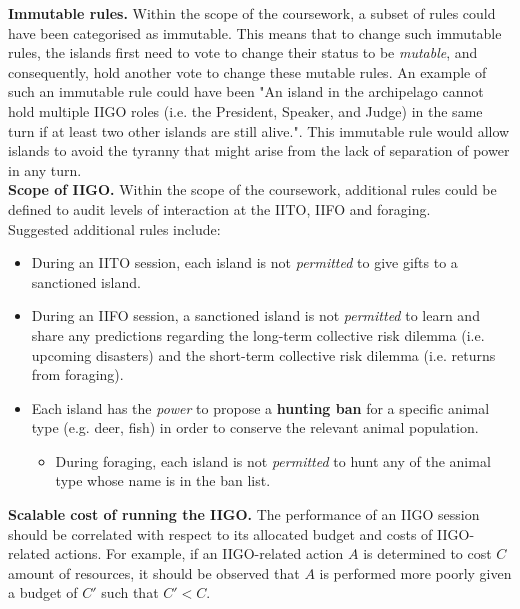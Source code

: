 \textbf{Immutable rules.} Within the scope of the coursework, a subset of rules could have been categorised as immutable. This means that to change such immutable rules, the islands first need to vote to change their status to be \emph{mutable}, and consequently, hold another vote to change these mutable rules. An example of such an immutable rule could have been "An island in the archipelago cannot hold multiple IIGO roles (i.e. the President, Speaker, and Judge) in the same turn if at least two other islands are still alive.". This immutable rule would allow islands to avoid the tyranny that might arise from the lack of separation of power in any turn.\\
\textbf{Scope of IIGO.} Within the scope of the coursework, additional rules could be defined to audit levels of interaction at the IITO, IIFO and foraging. \\
    Suggested additional rules include:
        \begin{itemize}
            \item During an IITO session, each island is not \emph{permitted} to give gifts to a sanctioned island.
             \item During an IIFO session, a sanctioned island is not \emph{permitted} to learn and share any predictions regarding the long-term collective risk dilemma (i.e. upcoming disasters) and the short-term collective risk dilemma (i.e. returns from foraging).
             \item Each island has the \emph{power} to propose a \textbf{hunting ban} for a specific animal type (e.g. deer, fish) in order to conserve the relevant animal population.
             \begin{itemize}
                \item During foraging, each island is not \emph{permitted} to hunt any of the animal type whose name is in the ban list.
             \end{itemize}  
        \end{itemize}
\textbf{Scalable cost of running the IIGO.} The performance of an IIGO session should be correlated with respect to its allocated budget and costs of IIGO-related actions. For example, if an IIGO-related action $A$ is determined to cost $C$ amount of resources, it should be observed that $A$ is performed more poorly given a budget of $C'$ such that $C' < C$.
